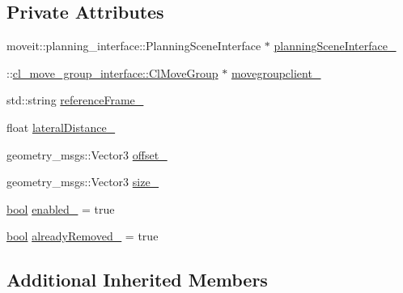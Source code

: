 \subsection*{Private Attributes}
\begin{DoxyCompactItemize}
\item 
moveit\+::planning\+\_\+interface\+::\+Planning\+Scene\+Interface $\ast$ \hyperlink{classsm__fetch__two__table__whiskey__pour_1_1cl__move__group__interface_1_1CpConstraintLateralWorkspace_a02ced63947e6608c9949b491b2575e3e}{planning\+Scene\+Interface\+\_\+}
\item 
\+::\hyperlink{classcl__move__group__interface_1_1ClMoveGroup}{cl\+\_\+move\+\_\+group\+\_\+interface\+::\+Cl\+Move\+Group} $\ast$ \hyperlink{classsm__fetch__two__table__whiskey__pour_1_1cl__move__group__interface_1_1CpConstraintLateralWorkspace_a0420ab20f9b4381751b273fc35f8ead9}{movegroupclient\+\_\+}
\item 
std\+::string \hyperlink{classsm__fetch__two__table__whiskey__pour_1_1cl__move__group__interface_1_1CpConstraintLateralWorkspace_af3a787dd9bdfa58d57270935af39b69b}{reference\+Frame\+\_\+}
\item 
float \hyperlink{classsm__fetch__two__table__whiskey__pour_1_1cl__move__group__interface_1_1CpConstraintLateralWorkspace_a15837ea9dc13b9da1cb94a85ba1c04d2}{lateral\+Distance\+\_\+}
\item 
geometry\+\_\+msgs\+::\+Vector3 \hyperlink{classsm__fetch__two__table__whiskey__pour_1_1cl__move__group__interface_1_1CpConstraintLateralWorkspace_ad3f79b0730471f65189d3bbb87f0352e}{offset\+\_\+}
\item 
geometry\+\_\+msgs\+::\+Vector3 \hyperlink{classsm__fetch__two__table__whiskey__pour_1_1cl__move__group__interface_1_1CpConstraintLateralWorkspace_a5d475923640591717dff98683928e89f}{size\+\_\+}
\item 
\hyperlink{classbool}{bool} \hyperlink{classsm__fetch__two__table__whiskey__pour_1_1cl__move__group__interface_1_1CpConstraintLateralWorkspace_a5a7dd0aa75d38aa540c88b0b7da347ec}{enabled\+\_\+} = true
\item 
\hyperlink{classbool}{bool} \hyperlink{classsm__fetch__two__table__whiskey__pour_1_1cl__move__group__interface_1_1CpConstraintLateralWorkspace_ab1dfe22f5f87a4f8727c9a1478afb1bc}{already\+Removed\+\_\+} = true
\end{DoxyCompactItemize}
\subsection*{Additional Inherited Members}


